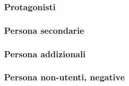 \subsubsection{Protagonisti}







\subsubsection{Persona secondarie}



\subsubsection{Persona addizionali}



\subsubsection{Persona non-utenti, negative}

